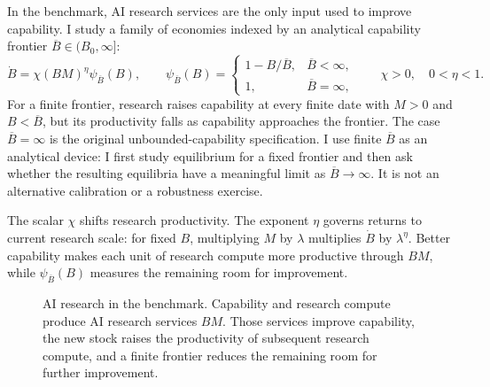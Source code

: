 In the benchmark, AI research services are the only input used to improve
capability. I study a family of economies indexed by an analytical capability
frontier \(\overline B\in(B_0,\infty]\):
\begin{equation}
 \dot B=\chi(BM)^\eta\psi_{\overline B}(B),
 \qquad
 \psi_{\overline B}(B)=
 \begin{cases}
  1-B/\overline B,&\overline B<\infty,\\
  1,&\overline B=\infty,
 \end{cases}
 \qquad \chi>0,\quad 0<\eta<1.
 \label{eq:axm-capability-law-benchmark}
\end{equation}
For a finite frontier, research raises capability at every finite date with
\(M>0\) and \(B<\overline B\), but its productivity falls as capability
approaches the frontier. The case \(\overline B=\infty\) is the original
unbounded-capability specification. I use finite \(\overline B\) as an
analytical device: I first study equilibrium for a fixed frontier and then ask
whether the resulting equilibria have a meaningful limit as
\(\overline B\to\infty\). It is not an alternative calibration or a robustness
exercise.

The scalar \(\chi\) shifts research productivity. The exponent \(\eta\) governs
returns to current research scale: for fixed \(B\), multiplying \(M\) by
\(\lambda\) multiplies \(\dot B\) by \(\lambda^\eta\). Better capability makes
each unit of research compute more productive through \(BM\), while
\(\psi_{\overline B}(B)\) measures the remaining room for improvement.

\begin{figure}[H]
 \centering
 \caption{AI research in the benchmark. Capability and research compute produce
 AI research services \(BM\). Those services improve capability, the new stock
 raises the productivity of subsequent research compute, and a finite frontier
 reduces the remaining room for further improvement.}
 \label{fig:axm-research-flow}
\end{figure}

